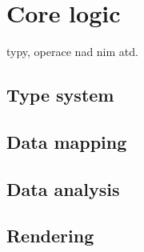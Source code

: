 \chapter{Core logic}
\label{chap:core-logic}
typy, operace nad nim atd.


\section{Type system}
\section{Data mapping}
\section{Data analysis}
\section{Rendering}
